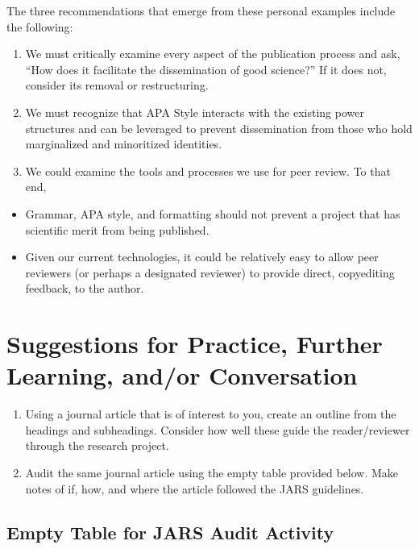\documentclass[
  11pt,
]{book}
\providecommand{\tightlist}{%
  \setlength{\itemsep}{0pt}\setlength{\parskip}{0pt}}
\begin{document}
The three recommendations that emerge from these personal examples include the following:

\begin{enumerate}
\def\labelenumi{\arabic{enumi}.}
\tightlist
\item
  We must critically examine every aspect of the publication process and ask, ``How does it facilitate the dissemination of good science?'' If it does not, consider its removal or restructuring.
\item
  We must recognize that APA Style interacts with the existing power structures and can be leveraged to prevent dissemination from those who hold marginalized and minoritized identities.
\item
  We could examine the tools and processes we use for peer review. To that end,
\end{enumerate}

\begin{itemize}
\tightlist
\item
  Grammar, APA style, and formatting should not prevent a project that has scientific merit from being published.
\item
  Given our current technologies, it could be relatively easy to allow peer reviewers (or perhaps a designated reviewer) to provide direct, copyediting feedback, to the author.
\end{itemize}

\hypertarget{suggestions-for-practice-further-learning-andor-conversation-1}{%
\section{Suggestions for Practice, Further Learning, and/or Conversation}\label{suggestions-for-practice-further-learning-andor-conversation-1}}

\begin{enumerate}
\def\labelenumi{\arabic{enumi}.}
\tightlist
\item
  Using a journal article that is of interest to you, create an outline from the headings and subheadings. Consider how well these guide the reader/reviewer through the research project.
\item
  Audit the same journal article using the empty table provided below. Make notes of if, how, and where the article followed the JARS guidelines.
\end{enumerate}

\hypertarget{empty-table-for-jars-audit-activity}{%
\subsection{Empty Table for JARS Audit Activity}\label{empty-table-for-jars-audit-activity}}
\end{document}
